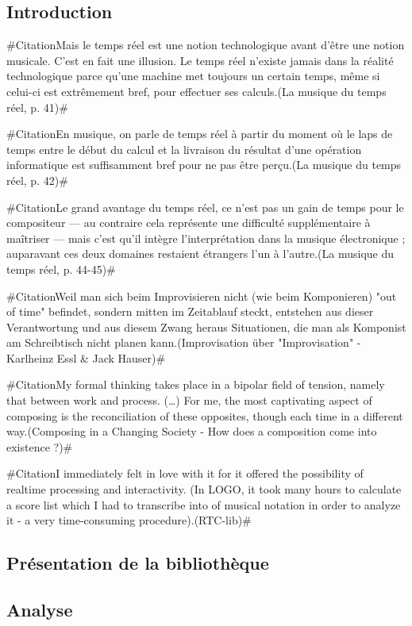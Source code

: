 \documentclass[a4paper,12pt]{article}
\newcommand{\zitat}[2]{\#Citation#1(#2)\#}
\begin{document}
\subsection{Introduction}

\zitat{Mais le temps réel est une notion technologique avant d'être une notion musicale. C'est en fait une illusion. Le temps réel n'existe jamais dans la réalité technologique parce qu'une machine met toujours un certain temps, même si celui-ci est extrêmement bref, pour effectuer ses calculs.}
{La musique du temps réel, p. 41}

\zitat{En musique, on parle de temps réel à partir du moment où le laps de temps entre le début du calcul et la livraison du résultat d'une opération informatique est suffisamment bref pour ne pas être perçu.}
{La musique du temps réel, p. 42}

\zitat{Le grand avantage du temps réel, ce n'est pas un gain de temps pour le compositeur --- au contraire cela représente une difficulté supplémentaire à maîtriser --- mais c'est qu'il intègre l'interprétation dans la musique électronique ; auparavant ces deux domaines restaient étrangers l'un à l'autre.}
{La musique du temps réel, p. 44-45}

\zitat{Weil man sich beim Improvisieren nicht (wie beim Komponieren) "out of time" befindet, sondern mitten im Zeitablauf steckt, entstehen aus dieser Verantwortung und aus diesem Zwang heraus Situationen, die man als Komponist am Schreibtisch nicht planen kann.}
{Improvisation über "Improvisation" - Karlheinz Essl \& Jack Hauser}

\zitat{My formal thinking takes place in a bipolar field of tension, namely that between work and process. (…) For me, the most captivating aspect of composing is the reconciliation of these opposites, though each time in a different way.}
{Composing in a Changing Society - How does a composition come into existence ?}

\zitat{I immediately felt in love with it for it offered the possibility of realtime processing and interactivity. (In LOGO, it took many hours to calculate a score list which I had to transcribe into of musical notation in order to analyze it - a very time-consuming procedure).}
{RTC-lib}

\subsection{Présentation de la bibliothèque}

\subsection{Analyse}
\end{document}
